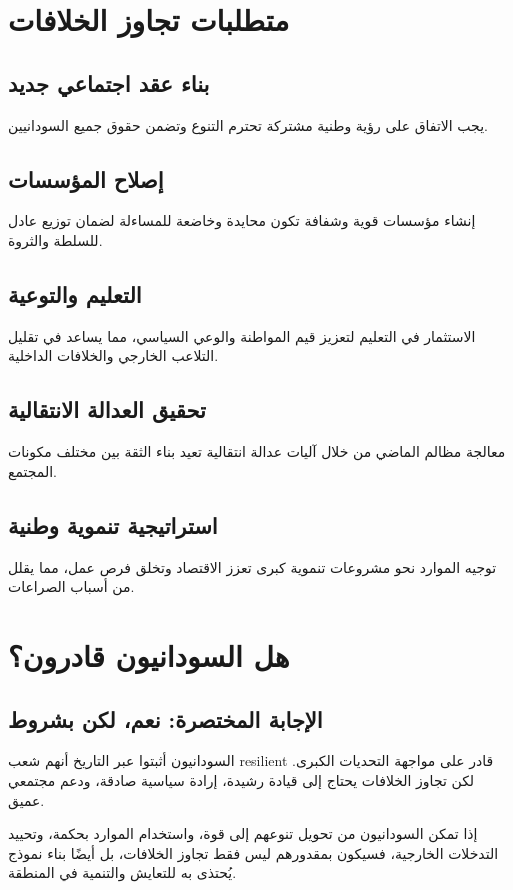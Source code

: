 \documentclass[12pt]{article}
\begin{document}
\section{متطلبات تجاوز الخلافات}
\subsection{بناء عقد اجتماعي جديد}
يجب الاتفاق على رؤية وطنية مشتركة تحترم التنوع وتضمن حقوق جميع السودانيين.

\subsection{إصلاح المؤسسات}
إنشاء مؤسسات قوية وشفافة تكون محايدة وخاضعة للمساءلة لضمان توزيع عادل للسلطة والثروة.

\subsection{التعليم والتوعية}
الاستثمار في التعليم لتعزيز قيم المواطنة والوعي السياسي، مما يساعد في تقليل التلاعب الخارجي والخلافات الداخلية.

\subsection{تحقيق العدالة الانتقالية}
معالجة مظالم الماضي من خلال آليات عدالة انتقالية تعيد بناء الثقة بين مختلف مكونات المجتمع.

\subsection{استراتيجية تنموية وطنية}
توجيه الموارد نحو مشروعات تنموية كبرى تعزز الاقتصاد وتخلق فرص عمل، مما يقلل من أسباب الصراعات.

\section{هل السودانيون قادرون؟}
\subsection{الإجابة المختصرة: نعم، لكن بشروط}
السودانيون أثبتوا عبر التاريخ أنهم شعب resilient قادر على مواجهة التحديات الكبرى. لكن تجاوز الخلافات يحتاج إلى قيادة رشيدة، إرادة سياسية صادقة، ودعم مجتمعي عميق.

إذا تمكن السودانيون من تحويل تنوعهم إلى قوة، واستخدام الموارد بحكمة، وتحييد التدخلات الخارجية، فسيكون بمقدورهم ليس فقط تجاوز الخلافات، بل أيضًا بناء نموذج يُحتذى به للتعايش والتنمية في المنطقة.
\end{document}
